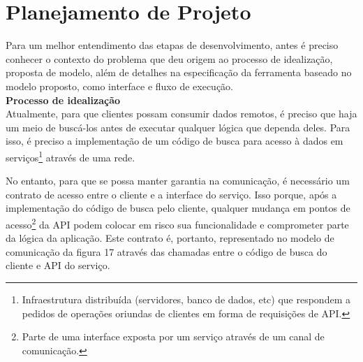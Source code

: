 \section{Planejamento de Projeto}

Para um melhor entendimento das etapas de desenvolvimento, antes é preciso conhecer o contexto do problema que deu origem ao processo de idealização, proposta de modelo, além de detalhes na especificação da ferramenta baseado no modelo proposto, como interface e fluxo de execução. \\

\textbf{Processo de idealização} \\

Atualmente, para que clientes possam consumir dados remotos, é preciso que haja um meio de buscá-los antes de executar qualquer lógica que dependa deles. Para isso, é preciso a implementação de um código de busca para acesso à dados em serviços\footnote{
  Infraestrutura distribuída (servidores, banco de dados, etc) que respondem a pedidos de operações oriundas de clientes em forma de requisições de API.
} através de uma rede.

No entanto, para que se possa manter garantia na comunicação, é necessário um contrato de acesso entre o cliente e a interface do serviço. Isso porque, após a implementação do código de busca pelo cliente, qualquer mudança em pontos de acesso\footnote{
  Parte de uma interface exposta por um serviço através de um canal de comunicação.
} da API podem colocar em risco sua funcionalidade e comprometer parte da lógica da aplicação. Este contrato é, portanto, representado no modelo de comunicação da figura 17 através das chamadas entre o código de busca do cliente e API do serviço.

